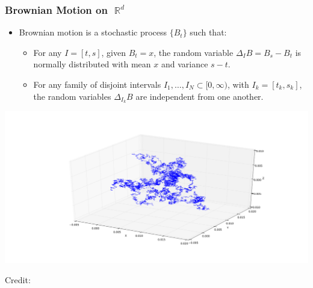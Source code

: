 \documentclass[usenames,dvipsnames,12pt]{beamer}
\DeclareMathOperator{\RR}{\mathbb{R}}
\begin{document}
\begin{frame}
    \frametitle{Brownian Motion on $\RR^d$}

    \begin{itemize}
        \item Brownian motion is a stochastic process $\{ B_t \}$ such that:
        \pause

        \begin{itemize}
            \item For any $I = [t,s]$, given $B_t = x$, the random variable $\Delta_I B = B_s - B_t$ is normally distributed with mean $x$ and variance $s - t$.

            \pause
            \item For any family of disjoint intervals $I_1,\dots,I_N \subset [0,\infty)$, with $I_k = [t_k,s_k]$, the random variables $\Delta_{I_k} B$ are independent from one another.
        \end{itemize}
    \end{itemize}

    \vspace{-5pt}

    \begin{center}
        \includegraphics[scale=0.2]{BrownianMotion.png}

        \vspace{-15pt}
        \hspace*{10pt}\hbox{\scriptsize Credit:}
    \end{center}
\end{frame}
\end{document}
